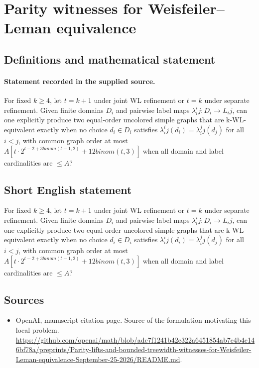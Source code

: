 \documentclass[11pt]{article}
\begin{document}
\section*{Parity witnesses for Weisfeiler–Leman equivalence}\label{statement}
\subsection{Definitions and mathematical statement}
\paragraph{Statement recorded in the supplied source.}
For fixed $k\geq 4$, let $t=k+1$ under joint WL refinement or $t=k$ under separate refinement. Given finite domains $D_i$ and pairwise label maps $\lambda ^i_ij:D_i\to L_ij$, can one explicitly produce two equal-order uncolored simple graphs that are k-WL-equivalent exactly when no choice $d_i\in D_i$ satisfies $\lambda ^i_ij(d_i)=\lambda ^j_ij(d_j)$ for all $i<j$, with common graph order at most $A[t\cdot 2^{t-2+3binom(t-1,2)}+12binom(t,3)]$ when all domain and label cardinalities are $\leq A$?
\subsection{Short English statement}
For fixed $k\geq 4$, let $t=k+1$ under joint WL refinement or $t=k$ under separate refinement. Given finite domains $D_i$ and pairwise label maps $\lambda ^i_ij:D_i\to L_ij$, can one explicitly produce two equal-order uncolored simple graphs that are k-WL-equivalent exactly when no choice $d_i\in D_i$ satisfies $\lambda ^i_ij(d_i)=\lambda ^j_ij(d_j)$ for all $i<j$, with common graph order at most $A[t\cdot 2^{t-2+3binom(t-1,2)}+12binom(t,3)]$ when all domain and label cardinalities are $\leq A$?
\subsection{Sources}
\begin{itemize}
\item[S1] OpenAI, manuscript citation page. Source of the formulation motivating this local problem.
\url{https://github.com/openai/math/blob/adc7f1241b42e322a6451854ab7e4b4c146bf78a/preprints/Parity-lifts-and-bounded-treewidth-witnesses-for-Weisfeiler-Leman-equivalence-September-25-2026/README.md}.
\end{itemize}
\end{document}
